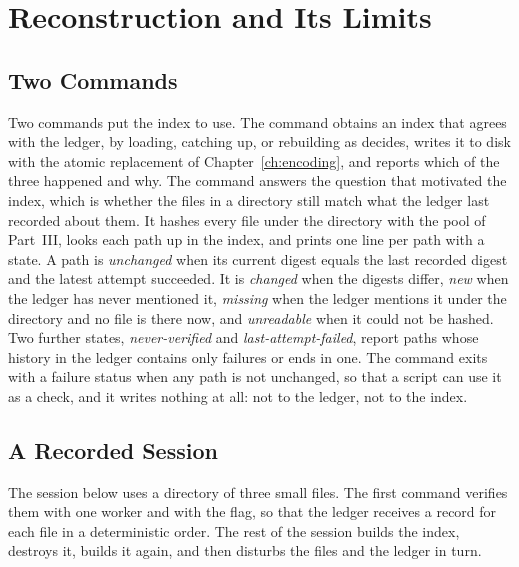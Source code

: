 \chapter{Reconstruction and Its Limits}
\label{ch:reconstruction}

\section{Two Commands}

Two commands put the index to use. The command  obtains an index that agrees with the ledger, by loading, catching up, or rebuilding as  decides, writes it to disk with the atomic replacement of Chapter~\ref{ch:encoding}, and reports which of the three happened and why. The command  answers the question that motivated the index, which is whether the files in a directory still match what the ledger last recorded about them. It hashes every file under the directory with the pool of Part~III, looks each path up in the index, and prints one line per path with a state. A path is \emph{unchanged} when its current digest equals the last recorded digest and the latest attempt succeeded. It is \emph{changed} when the digests differ, \emph{new} when the ledger has never mentioned it, \emph{missing} when the ledger mentions it under the directory and no file is there now, and \emph{unreadable} when it could not be hashed. Two further states, \emph{never-verified} and \emph{last-attempt-failed}, report paths whose history in the ledger contains only failures or ends in one. The command exits with a failure status when any path is not unchanged, so that a script can use it as a check, and it writes nothing at all: not to the ledger, not to the index.

\section{A Recorded Session}

The session below uses a directory of three small files. The first command verifies them with one worker and with the  flag, so that the ledger receives a record for each file in a deterministic order. The rest of the session builds the index, destroys it, builds it again, and then disturbs the files and the ledger in turn.



